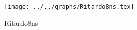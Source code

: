 \begin{figure}[h] \centering\texttt{[image: ../../graphs/Ritardo8ns.tex]}\caption{Ritardo8ns}\label{gr:Ritardo8ns} \end{figure}
